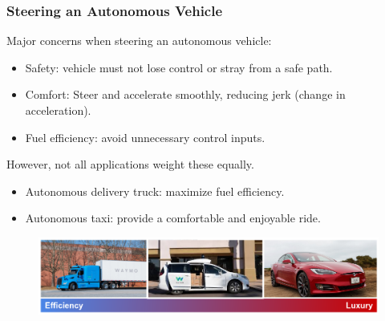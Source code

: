 \documentclass{beamer}
\begin{document}
\begin{frame}
\frametitle{Steering an Autonomous Vehicle}
Major concerns when steering an autonomous vehicle:
\begin{itemize}
\item Safety: vehicle must not lose control or stray from a safe path.
\item Comfort: Steer and accelerate smoothly, reducing jerk (change in acceleration).
\item Fuel efficiency: avoid unnecessary control inputs.
\end{itemize}

However, not all applications weight these equally.
\begin{itemize}
\item Autonomous delivery truck: maximize fuel efficiency.
\item Autonomous taxi: provide a comfortable and enjoyable ride.
\end{itemize}

\begin{figure}
	\includegraphics[width=1.0\linewidth]{figures/configurability.png}
\end{figure}
\end{frame}
\end{document}
